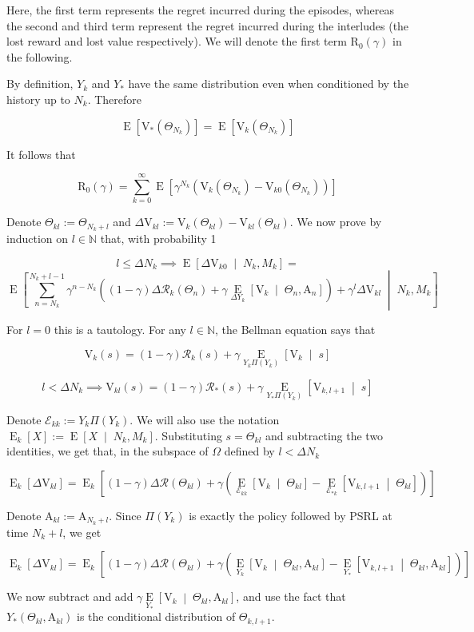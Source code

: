 \documentclass[a4paper]{article}
\newcommand{\AP}[1]{\left(#1\right)}
\newcommand{\AB}[1]{\left[#1\right]}
\newcommand{\ABM}[2]{\left[#1\;\middle\vert\;#2\right]}
\newcommand{\E}[1]{\operatorname{E}\AB{#1}}
\newcommand{\CE}[3]{\underset{#1}{\operatorname{E}}\ABM{#2}{#3}}
\newcommand{\Nats}{\mathbb{N}}
\newcommand{\R}{\mathcal{R}}
\newcommand{\V}{\mathrm{V}}
\newcommand{\Reg}{\mathrm{R}}
\newcommand{\THy}{Y_*}
\newcommand{\SHy}{Y}
\newcommand{\AT}{\mathrm{A}}
\newcommand{\Ev}{\mathcal{E}}
\newcommand{\ET}{N}
\newcommand{\IT}{M}
\newcommand{\TE}[1]{{\operatorname{E}_k}\AB{#1}}
\begin{document}
Here, the first term represents the regret incurred during the episodes, whereas the second and third term represent the regret incurred during the interludes (the lost reward and lost value respectively). We will denote the first term $\Reg_0(\gamma)$ in the following.

By definition, $\SHy_{k}$ and $\SHy_*$ have the same distribution even when conditioned by the history up to $\ET_k$. Therefore

$$\E{\V_{*}\AP{\Theta_{\ET_k}}}=\E{\V_{k}\AP{\Theta_{\ET_k}}}$$

It follows that

$$\Reg_0(\gamma)=\sum_{k=0}^\infty{\E{\gamma^{\ET_k}\AP{\V_{k}\AP{\Theta_{\ET_k}}-\V_{k0}\AP{\Theta_{\ET_k}}}}}$$

Denote $\Theta_{kl}:=\Theta_{\ET_k+l}$ and $\Delta\V_{kl}:=\V_k\AP{\Theta_{kl}}-\V_{kl}\AP{\Theta_{kl}}$. We now prove by induction on $l\in\Nats$ that, with probability 1

$$l\leq\Delta\ET_k\implies\CE{}{\Delta\V_{k0}}{\ET_k,\IT_k}=$$
$$\CE{}{\sum_{n=\ET_k}^{\ET_k+l-1}\gamma^{n-\ET_k}\AP{(1-\gamma)\Delta\R_k\AP{\Theta_n}+\gamma\CE{\Delta\SHy_k}{\V_{k}}{\Theta_n,\AT_n}}+\gamma^l\Delta\V_{kl}}{\ET_k,\IT_k}$$

For $l=0$ this is a tautology. For any $l\in\Nats$, the Bellman equation says that

$$\V_k(s)=(1-\gamma)\R_k(s)+\gamma\CE{\SHy_{k}\Pi\AP{\SHy_{k}}}{\V_k}{s}$$

$$l<\Delta\ET_k\implies\V_{kl}(s)=(1-\gamma)\R_*(s)+\gamma\CE{\SHy_{*}\Pi\AP{\SHy_{k}}}{\V_{k,l+1}}{s}$$

Denote $\Ev_{kk}:=\SHy_k\Pi\AP{\SHy_k}$. We will also use the notation $\TE{X}:=\CE{}{X}{\ET_k,\IT_k}$. Substituting $s=\Theta_{kl}$ and subtracting the two identities, we get that, in the subspace of $\Omega$ defined by $l<\Delta\ET_k$

$$\TE{\Delta\V_{kl}}=\TE{(1-\gamma)\Delta\R\AP{\Theta_{kl}}+\gamma\AP{\CE{\Ev_{kk}}{\V_k}{\Theta_{kl}}-\CE{\Ev_{*k}}{\V_{k,l+1}}{\Theta_{kl}}}}$$

Denote $\AT_{kl}:=\AT_{\ET_k+l}$. Since $\Pi\AP{\SHy_{k}}$ is exactly the policy followed by PSRL at time $\ET_k+l$, we get

$$\TE{\Delta\V_{kl}}=\TE{(1-\gamma)\Delta\R\AP{\Theta_{kl}}+\gamma\AP{\CE{\SHy_k}{\V_k}{\Theta_{kl},\AT_{kl}}-\CE{\THy}{\V_{k,l+1}}{\Theta_{kl},\AT_{kl}}}}$$

We now subtract and add $\gamma\CE{\SHy_*}{\V_k}{\Theta_{kl},\AT_{kl}}$, and use the fact that $\SHy_*\AP{\Theta_{kl},\AT_{kl}}$ is the conditional distribution of $\Theta_{k,l+1}$.
\end{document}
